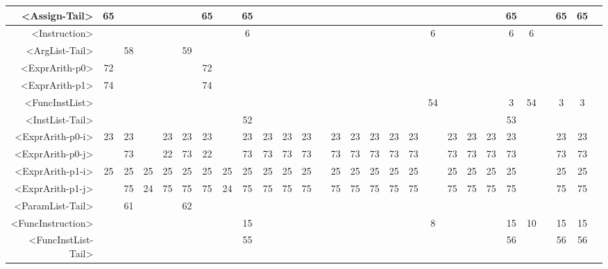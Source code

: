 \begin{tabular}{r|c@{ }c@{ }c@{ }c@{ }c@{ }c@{ }c@{ }c@{ }c@{ }c@{ }c@{ }c@{ }c@{ }c@{ }c@{ }c@{ }c@{ }c@{ }c@{ }c@{ }c@{ }c@{ }c@{ }c@{ }c@{ }c@{ }c@{ }}
<Assign-Tail> & 65 &   &   &   &   & 65 &   & 65 &   &   &   &   &   &   &   &   &   &   &   &   &   & 65 &   &   & 65 & 65 &   \\\hline
<Instruction> &   &   &   &   &   &   &   & 6 &   &   &   &   &   &   &   &   &   & 6 &   &   &   & 6 & 6 &   &   &   &   \\\hline
<ArgList-Tail> &   & 58 &   &   & 59 &   &   &   &   &   &   &   &   &   &   &   &   &   &   &   &   &   &   &   &   &   &   \\\hline
<ExprArith-p0> & 72 &   &   &   &   & 72 &   &   &   &   &   &   &   &   &   &   &   &   &   &   &   &   &   &   &   &   &   \\\hline
<ExprArith-p1> & 74 &   &   &   &   & 74 &   &   &   &   &   &   &   &   &   &   &   &   &   &   &   &   &   &   &   &   &   \\\hline
<FuncInstList> &   &   &   &   &   &   &   &   &   &   &   &   &   &   &   &   &   & 54 &   &   &   & 3 & 54 &   & 3 & 3 &   \\\hline
<InstList-Tail> &   &   &   &   &   &   &   & 52 &   &   &   &   &   &   &   &   &   &   &   &   &   & 53 &   &   &   &   &   \\\hline
<ExprArith-p0-i> & 23 & 23 &   & 23 & 23 & 23 &   & 23 & 23 & 23 & 23 &   & 23 & 23 & 23 & 23 & 23 &   & 23 & 23 & 23 & 23 &   &   & 23 & 23 &   \\\hline
<ExprArith-p0-j> &   & 73 &   & 22 & 73 & 22 &   & 73 & 73 & 73 & 73 &   & 73 & 73 & 73 & 73 & 73 &   & 73 & 73 & 73 & 73 &   &   & 73 & 73 &   \\\hline
<ExprArith-p1-i> & 25 & 25 & 25 & 25 & 25 & 25 & 25 & 25 & 25 & 25 & 25 &   & 25 & 25 & 25 & 25 & 25 &   & 25 & 25 & 25 & 25 &   &   & 25 & 25 &   \\\hline
<ExprArith-p1-j> &   & 75 & 24 & 75 & 75 & 75 & 24 & 75 & 75 & 75 & 75 &   & 75 & 75 & 75 & 75 & 75 &   & 75 & 75 & 75 & 75 &   &   & 75 & 75 &   \\\hline
<ParamList-Tail> &   & 61 &   &   & 62 &   &   &   &   &   &   &   &   &   &   &   &   &   &   &   &   &   &   &   &   &   &   \\\hline
<FuncInstruction> &   &   &   &   &   &   &   & 15 &   &   &   &   &   &   &   &   &   & 8 &   &   &   & 15 & 10 &   & 15 & 15 &   \\\hline
<FuncInstList-Tail> &   &   &   &   &   &   &   & 55 &   &   &   &   &   &   &   &   &   &   &   &   &   & 56 &   &   & 56 & 56 &   \\\hline
\end{tabular}


